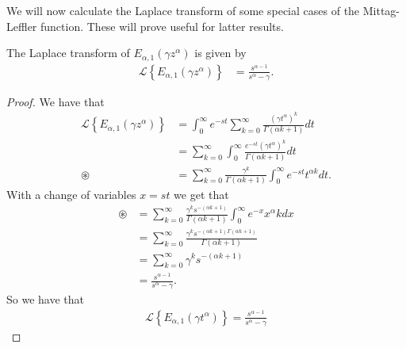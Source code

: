 We will now calculate the Laplace transform of some special cases of the Mittag-Leffler function. These will prove useful for latter results. 
\begin{mdframed}[innertopmargin=10pt]
\begin{lemma}
    \label{lem:lap_mit}
    The Laplace transform of $ E_{\alpha, 1}(\gamma z^\alpha ) $ is given by
    \begin{align}
        \mathcal{L} \left\{ E_{\alpha, 1}(\gamma z^\alpha ) \right\} &= \frac{s^{\alpha - 1}}{s^\alpha - \gamma}.
    \end{align}
\end{lemma}
\end{mdframed}
\begin{proof}
    We have that
    \begin{align}
        \mathcal{L}\left\{ E_{\alpha, 1}(\gamma z^\alpha)\right\} &= \int_0^\infty e^{-st} \sum_{k=0}^\infty \frac{(\gamma t^\alpha)^k}{\Gamma(\alpha k + 1)} dt \\
        &= \sum_{k=0}^\infty \int_0^\infty \frac{e^{-st} (\gamma t^\alpha)^k}{\Gamma(\alpha k + 1)} dt \\
        \circledast &= \sum_{k=0}^\infty \frac{\gamma^k}{\Gamma(\alpha k + 1)}\int_0^\infty e^{-st}t^{\alpha k} dt.
    \end{align}
    With a change of variables $ x = st $ we get that
    \begin{align}
        \circledast &= \sum_{k=0}^\infty \frac{\gamma^k s^{-(\alpha k+1)}}{\Gamma(\alpha k + 1)} \int_0^\infty e^{-x} x^\alpha kdx \\
        &= \sum_{k=0}^\infty \frac{\gamma^k s^{-(\alpha k + 1)\Gamma(\alpha k + 1)}}{\Gamma(\alpha k + 1)} \\
        &= \sum_{k=0}^\infty \gamma^k s^{-(\alpha k+1)} \\
        &= \frac{s^{\alpha - 1}}{s^\alpha - \gamma}.
    \end{align}
    So we have that
    \begin{align}
        \mathcal{L}\left\{ E_{\alpha,1}( \gamma t^\alpha ) \right\} = \frac{s^{\alpha - 1}}{s^\alpha - \gamma}
    \end{align}
\end{proof}


